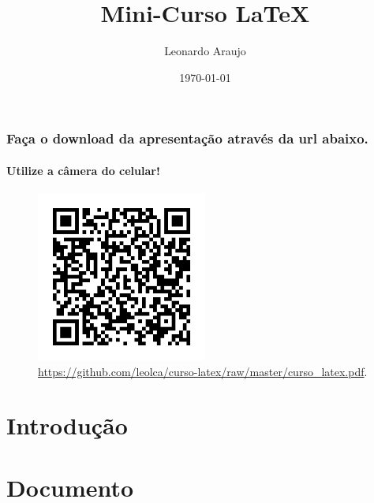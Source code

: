 \documentclass[xcolor={table}]{beamer}
\title[Mini-Curso \LaTeX{}]{Mini-Curso \LaTeX{}}
\author{Leonardo Araujo}
\date{\today}
\institute{UFSJ}
\begin{document}
\begin{frame}[plain]
\maketitle
\end{frame}


\begin{frame}
\frametitle{Faça o download da apresentação através da url abaixo.}
\framesubtitle{Utilize a câmera do celular!}
  \begin{figure}[h!]
  \centering
  \includegraphics[width=0.5\textwidth]{figures/qr_img.png}
  \caption{\url{https://github.com/leolca/curso-latex/raw/master/curso_latex.pdf}.}
  \label{fig:qrcode}
  \end{figure}
\end{frame}

\section{Introdução}\label{sec:intro}


\section{Documento}\label{sec:doc}

\end{document}
